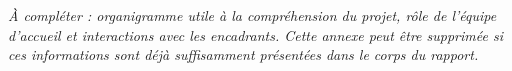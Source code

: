 
\textit{À compléter : organigramme utile à la compréhension du projet, rôle de
l'équipe d'accueil et interactions avec les encadrants. Cette annexe peut être
supprimée si ces informations sont déjà suffisamment présentées dans le corps
du rapport.}

